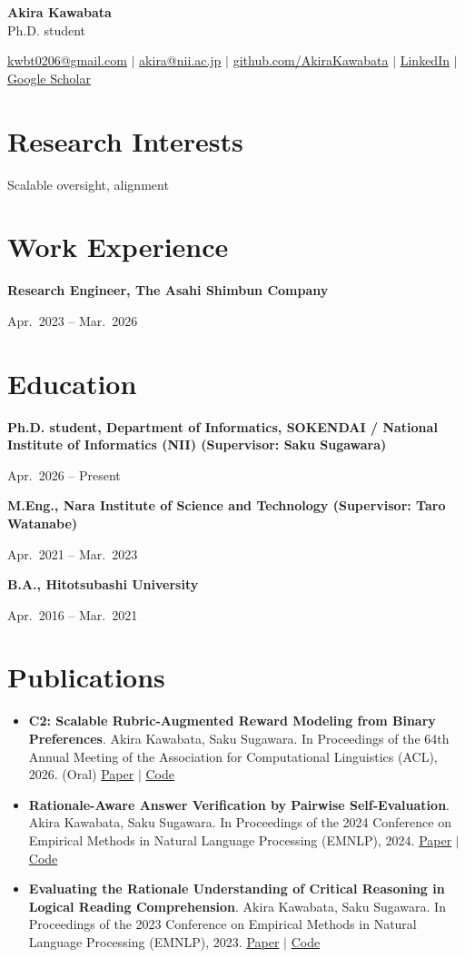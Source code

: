 \documentclass[10pt,letterpaper]{article}
\newcommand{\entry}[2]{
  \noindent
  \begin{minipage}[t]{0.76\textwidth}
    \vspace{0pt}
    \textbf{#1}
  \end{minipage}%
  \hfill
  \begin{minipage}[t]{0.22\textwidth}
    \vspace{0pt}
    \raggedright #2
  \end{minipage}\par
}
\begin{document}
{\LARGE \textbf{Akira Kawabata}}\\
Ph.D. student

\vspace{0.35em}
\href{mailto:kwbt0206@gmail.com}{kwbt0206@gmail.com}
\enspace $|$ \enspace
\href{mailto:akira@nii.ac.jp}{akira@nii.ac.jp}
\enspace $|$ \enspace
\href{https://github.com/AkiraKawabata}{github.com/AkiraKawabata}
\enspace $|$ \enspace
\href{https://www.linkedin.com/in/akira-kawabata-4b0bb7203/}{LinkedIn}
\enspace $|$ \enspace
\href{https://scholar.google.com/citations?user=rP1K2-UAAAAJ}{Google Scholar}

\section*{Research Interests}
Scalable oversight, alignment

\section*{Work Experience}
\entry{Research Engineer, The Asahi Shimbun Company}{Apr.\ 2023 -- Mar.\ 2026}

\section*{Education}
\entry{Ph.D. student, Department of Informatics, SOKENDAI / National Institute of Informatics (NII) (Supervisor: Saku Sugawara)}{Apr.\ 2026 -- Present}
\entry{M.Eng., Nara Institute of Science and Technology (Supervisor: Taro Watanabe)}{Apr.\ 2021 -- Mar.\ 2023}
\entry{B.A., Hitotsubashi University}{Apr.\ 2016 -- Mar.\ 2021}

\section*{Publications}
\begin{itemize}
  \item \textbf{C2: Scalable Rubric-Augmented Reward Modeling from Binary Preferences}. Akira Kawabata, Saku Sugawara. In Proceedings of the 64th Annual Meeting of the Association for Computational Linguistics (ACL), 2026. (Oral)
  \href{https://aclanthology.org/2026.acl-long.523/}{Paper}
  \enspace $|$ \enspace
  \href{https://github.com/asahi-research/C2}{Code}

  \item \textbf{Rationale-Aware Answer Verification by Pairwise Self-Evaluation}. Akira Kawabata, Saku Sugawara. In Proceedings of the 2024 Conference on Empirical Methods in Natural Language Processing (EMNLP), 2024.
  \href{https://aclanthology.org/2024.emnlp-main.905/}{Paper}
  \enspace $|$ \enspace
  \href{https://github.com/AkiraKawabata/REPS}{Code}

  \item \textbf{Evaluating the Rationale Understanding of Critical Reasoning in Logical Reading Comprehension}. Akira Kawabata, Saku Sugawara. In Proceedings of the 2023 Conference on Empirical Methods in Natural Language Processing (EMNLP), 2023.
  \href{https://aclanthology.org/2023.emnlp-main.9/}{Paper}
  \enspace $|$ \enspace
  \href{https://github.com/nii-cl/rule}{Code}
\end{itemize}
\end{document}
